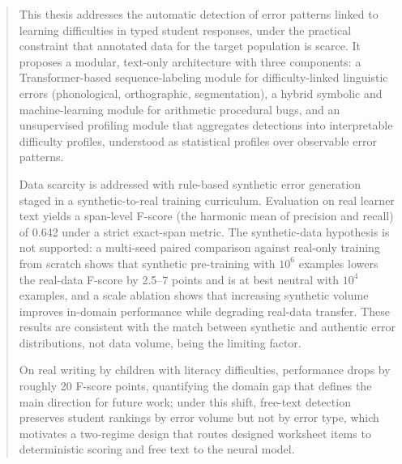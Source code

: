 %


\begin{abstract}

This thesis addresses the automatic detection of error patterns linked to learning difficulties in typed student responses, under the practical constraint that annotated data for the target population is scarce. It proposes a modular, text-only architecture with three components: a Transformer-based sequence-labeling module for difficulty-linked linguistic errors (phonological, orthographic, segmentation), a hybrid symbolic and machine-learning module for arithmetic procedural bugs, and an unsupervised profiling module that aggregates detections into interpretable difficulty profiles, understood as statistical profiles over observable error patterns.

Data scarcity is addressed with rule-based synthetic error generation staged in a synthetic-to-real training curriculum. Evaluation on real learner text yields a span-level F-score (the harmonic mean of precision and recall) of 0.642 under a strict exact-span metric. The synthetic-data hypothesis is not supported: a multi-seed paired comparison against real-only training from scratch shows that synthetic pre-training with $10^6$ examples lowers the real-data F-score by 2.5--7 points and is at best neutral with $10^4$ examples, and a scale ablation shows that increasing synthetic volume improves in-domain performance while degrading real-data transfer. These results are consistent with the match between synthetic and authentic error distributions, not data volume, being the limiting factor.

On real writing by children with literacy difficulties, performance drops by roughly 20 F-score points, quantifying the domain gap that defines the main direction for future work; under this shift, free-text detection preserves student rankings by error volume but not by error type, which motivates a two-regime design that routes designed worksheet items to deterministic scoring and free text to the neural model.


\end{abstract}
